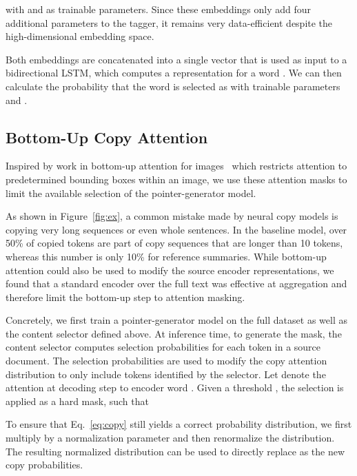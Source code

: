 \documentclass[11pt,a4paper]{article}
\begin{document}
\noindent with  and  as trainable parameters. Since these embeddings only add four additional parameters to the tagger, it remains very data-efficient despite the high-dimensional embedding space. 

Both embeddings are concatenated into a single vector that is used as input to a bidirectional LSTM, which computes a representation  for a word . We can then calculate the probability  that the word is selected as  with trainable parameters  and . 


\subsection{Bottom-Up Copy Attention}
\label{sec:rest}
Inspired by work in bottom-up attention for images~\citep{anderson2017bottom} which restricts attention to predetermined bounding boxes within an image, we use these attention masks to
limit the available selection of the pointer-generator model.

As shown in Figure~\ref{fig:ex}, a common mistake made by neural copy models is copying very long sequences or even whole sentences. In the baseline model, over 50\% of copied tokens are part of copy sequences that are longer than 10 tokens, whereas this number is only 10\% for reference summaries. While bottom-up attention could also be used to modify the source encoder representations, we found that a standard encoder over the full text was effective at aggregation and therefore limit the bottom-up step to attention masking.



Concretely, we first train a pointer-generator model on the full dataset as well as the content selector defined above.
At inference time, to generate the mask, the content selector computes selection probabilities  for each token in a source document. The selection probabilities are used to modify the copy attention distribution to only include tokens identified by the selector. 
Let  denote the attention at decoding step  to encoder word .
Given a threshold , the selection is applied as a hard mask, such that



\noindent  To ensure that Eq.~\ref{eq:copy} still yields a correct probability distribution, we first multiply  by a normalization parameter  and then renormalize the distribution. The resulting normalized distribution can be used to directly replace  as the new copy probabilities.
\end{document}
